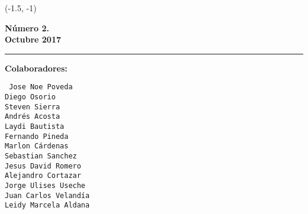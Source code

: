 \begin{textblock}{30}(-1.5, -1)
\begin{minipage}{0.12\linewidth}
\sf\color{barcolor}
\begin{center}

\vspace{1cm}

\colorbox{black}{
{\resizebox{3cm}{0.7cm}{\textcolor{white}{\bf\sf\large GLUD}}}
}
{\resizebox{2.5cm}{0.4cm}{\textcolor{white}{\bf\sf\large Magazine}}}

\vspace{4mm}

{\bf Número 2.\\ Octubre 2017}

\vspace{2cm}
\hrule

\vspace{7mm}









{\bf Colaboradores:}

\vspace{1mm}

{\tt
Jose Noe Poveda\\
Diego Osorio\\
Steven Sierra\\
Andrés Acosta\\
Laydi Bautista\\
Fernando Pineda\\
Marlon Cárdenas\\
Sebastian Sanchez\\
Jesus David Romero\\
Alejandro Cortazar\\
Jorge Ulises Useche\\
Juan Carlos Velandía\\
Leidy Marcela Aldana}


\end{center}
\end{minipage}
\end{textblock}
